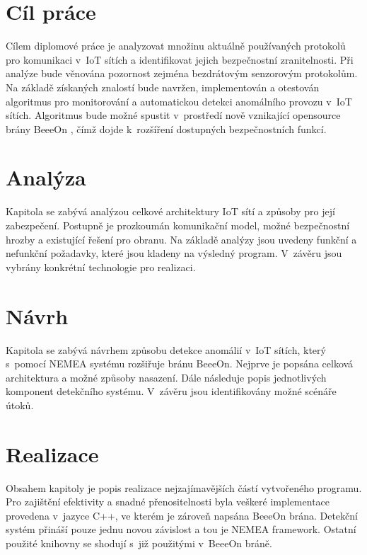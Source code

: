 \documentclass[thesis=M,czech]{FITthesis}[2012/06/26]
\begin{document}
\chapter{Cíl práce}
Cílem diplomové práce je analyzovat množinu aktuálně používaných protokolů
pro komunikaci v~IoT sítích a identifikovat jejich bezpečnostní zranitelnosti.
Při analýze bude věnována pozornost zejména bezdrátovým senzorovým protokolům.
Na základě získaných znalostí bude navržen, implementován a otestován algoritmus
pro monitorování a automatickou detekci anomálního provozu v~IoT sítích.
Algoritmus bude možné spustit
v~prostředí nově vznikající opensource brány BeeeOn \cite{beeeon}, čímž dojde k~rozšíření 
dostupných bezpečnostních funkcí.


\chapter{Analýza}
Kapitola se zabývá analýzou celkové architektury IoT sítí a způsoby pro její
zabezpečení. Postupně je prozkoumán komunikační model, možné bezpečnostní hrozby 
a existující řešení pro obranu. Na základě analýzy jsou uvedeny funkční a nefunkční
požadavky, které jsou kladeny na výsledný program. V~závěru jsou vybrány konkrétní
technologie pro realizaci.

 


\chapter{Návrh}
Kapitola se zabývá návrhem způsobu detekce anomálií v~IoT sítích, který s~pomocí NEMEA
systému rozšiřuje bránu BeeeOn. Nejprve je popsána celková architektura a
možné způsoby nasazení. Dále následuje popis jednotlivých komponent detekčního systému.
V~závěru jsou identifikovány možné scénáře útoků.

 

\chapter{Realizace}
Obsahem kapitoly je popis realizace nejzajímavějších částí vytvořeného programu. Pro zajištění
efektivity a snadné přenositelnosti byla veškeré implementace provedena v~jazyce C++, ve kterém
je zároveň napsána BeeeOn brána. Detekční systém přináší pouze jednu novou závislost a tou je NEMEA framework.
Ostatní použité knihovny se shodují s~již použitými v~BeeeOn bráně.

 
\end{document}
